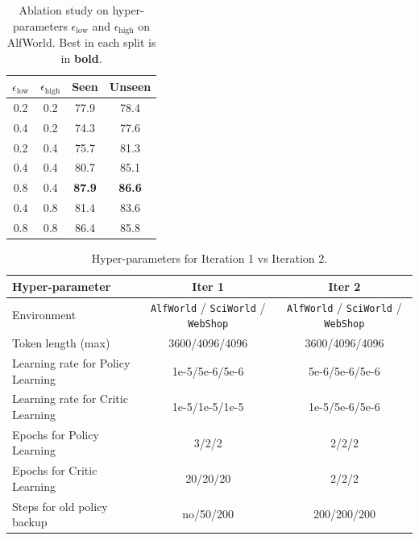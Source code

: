 \begin{table}
\centering
\caption{Ablation study on hyper-parameters $\epsilon_{\text{low}}$ and $\epsilon_{\text{high}}$ on AlfWorld. Best in each split is in \textbf{bold}.}
\label{tab:eps_ablation_alfworld}
\begin{tabular}{cc|cc}
\toprule
$\epsilon_{\text{low}}$ & $\epsilon_{\text{high}}$ & Seen & Unseen \\
\midrule
0.2 & 0.2 &   77.9 & 78.4 \\
0.4 & 0.2 &  74.3 & 77.6 \\
0.2 & 0.4 & 75.7 & 81.3 \\
0.4 & 0.4 &  80.7 & 85.1 \\
0.8 & 0.4 &  \textbf{87.9} & \textbf{86.6} \\
0.4 & 0.8 &  81.4 & 83.6 \\
0.8 & 0.8 &  86.4 & 85.8 \\
\bottomrule
\end{tabular}
\end{table}

\begin{table}
\centering
\small
\caption{Hyper-parameters for Iteration 1 vs Iteration 2.}
\label{tab:iter_key_hparams}
\setlength{\tabcolsep}{8pt}
\renewcommand{\arraystretch}{1.2}
\begin{tabular}{lcc}
\toprule
\textbf{Hyper-parameter} & \textbf{Iter 1} & \textbf{Iter 2} \\
\midrule
Environment & \texttt{AlfWorld} / \texttt{SciWorld} / \texttt{WebShop} & \texttt{AlfWorld} / \texttt{SciWorld} / \texttt{WebShop} \\
Token length (max) & 3600/4096/4096 & 3600/4096/4096 \\
Learning rate for Policy Learning & 1e-5/5e-6/5e-6 & 5e-6/5e-6/5e-6 \\
Learning rate for Critic Learning & 1e-5/1e-5/1e-5 & 1e-5/5e-6/5e-6 \\

Epochs for Policy Learning & 3/2/2 & 2/2/2 \\
Epochs for Critic Learning & 20/20/20 & 2/2/2 \\
Steps for old policy backup & no/50/200 & 200/200/200  \\
\bottomrule
\end{tabular}
\label{tab:hyper-param2}
\end{table}

